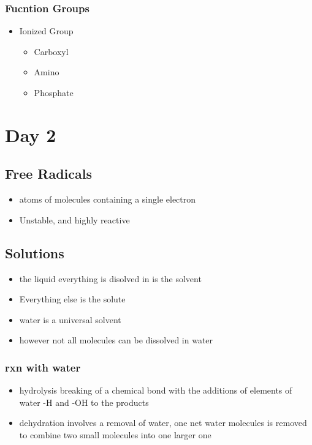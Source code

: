 \documentclass[11pt]{article}
\begin{document}
\subsubsection{Fucntion Groups}
\label{sec:org3a9d0ef}
\begin{itemize}
\item Ionized Group
\begin{itemize}
\item Carboxyl
\item Amino
\item Phosphate
\end{itemize}
\end{itemize}
\section{Day 2}
\label{sec:org72dc7db}
\subsection{Free Radicals}
\label{sec:orge578488}
\begin{itemize}
\item atoms of molecules containing a single electron
\item Unstable, and highly reactive
\end{itemize}
\subsection{Solutions}
\label{sec:org1c79762}
\begin{itemize}
\item the liquid everything is disolved in is the solvent
\item Everything else is the solute
\item water is a universal solvent
\item however not all molecules can be dissolved in water
\end{itemize}
\subsubsection{rxn with water}
\label{sec:org372e01d}
\begin{itemize}
\item hydrolysis breaking of a chemical bond with the additions of elements of water -H and -OH to the products
\item dehydration involves a removal of water, one net water molecules is removed to combine two small molecules into one larger one
\end{itemize}
\end{document}
